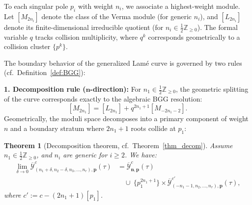 \documentclass[11pt]{amsart}
\newtheorem{theorem}{Theorem}[section]
\theoremstyle{remark}
\numberwithin{equation}{section}
\begin{document}
To each singular pole $p_i$ with weight $n_i$, we associate a highest-weight module. Let $[M_{2n_i}]$ denote the class of the Verma module (for generic $n_i$), and $[L_{2n_i}]$ denote its finite-dimensional irreducible quotient (for $n_i \in \frac{1}{2}\mathbb{Z}_{\geq 0}$). The formal variable $q$ tracks collision multiplicity, where $q^k$ corresponds geometrically to a collision cluster $\{p^k\}$.

The boundary behavior of the generalized Lam\'e curve is governed by two rules (cf.~Definition~\ref{def:BGG}):

\vspace{0.5em}
\noindent \textbf{1. Decomposition rule ($\mathbf{n}$-direction):} For $n_1 \in \frac{1}{2}\mathbb{Z}_{\geq 0}$, the geometric splitting of the curve corresponds exactly to the algebraic BGG resolution:
\[
    [M_{2n_1}] = [L_{2n_1}] + q^{2n_1+1} [M_{-2n_1-2}].
\]
Geometrically, the moduli space decomposes into a primary component of weight $n$ and a boundary stratum where $2n_1+1$ roots collide at $p_1$:
\begin{theorem}[Decomposition theorem, cf.~Theorem~\ref{thm_decom}]
Assume $n_1 \in \frac{1}{2}\mathbb{Z}_{\geq 0}$, and $n_i$ are generic for $i \ge 2$. We have:
\[
\begin{split}
    \lim_{\delta \rightarrow 0}\overline{\mathcal{Y}}_{(n_1+\delta,n_2-\delta,n_3,\dots,n_r),\mathbf{p} }^c(\tau) &= \overline{\mathcal{Y}}_{\mathbf{n},\mathbf{p} }^c(\tau) \\
    &\quad \cup \ \{p_1^{2n_1+1}\} \times \overline{\mathcal{Y}}^{c'}_{(-n_1-1,n_2,\dots,n_r),\mathbf{p}} (\tau),
\end{split}
\]
where $c' := c - (2n_1+1) [p_1]$.
\end{theorem}
\end{document}

